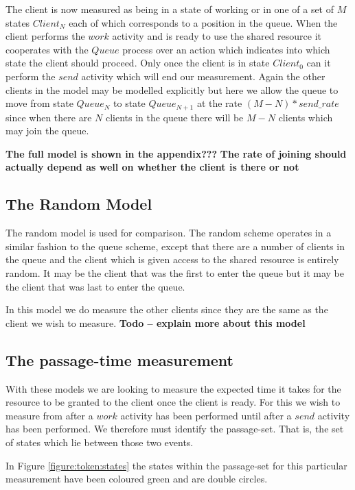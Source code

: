 \documentclass[times, 10pt,twocolumn]{article}
\newcommand{\adcComment}[1]{\textbf{#1}}
\newcommand{\quoteActivity}[1]{$#1$}
\newcommand{\quoteProcess}[1]{$#1$}
\begin{document}
The client is now measured as being in a state of working or
in one of a set of $M$ states \quoteProcess{Client_N} 
each of which corresponds to a position in the queue.
When the client performs the \quoteActivity{work} activity
and is ready to use the shared resource it cooperates with the
\quoteProcess{Queue} process over an action which indicates into which
state the client should proceed. Only once the client is in state
\quoteProcess{Client_0} can it perform the \quoteActivity{send}
activity which will end our measurement.
Again the other clients in the model may be modelled explicitly but
here we allow the queue to move from state \quoteProcess{Queue_N}
to state \quoteProcess{Queue_{N + 1}} at the rate
$(M - N) * send\_rate$ since when there are $N$ clients in the queue
there will be $M - N$ clients which may join the queue.

\adcComment{The full model is shown in the appendix???}
\adcComment{The rate of joining should actually depend as well on
whether the client is there or not}

\subsection{The Random Model}
The random model is used for comparison. The random scheme operates
in a similar fashion to the queue scheme, except that there are a number
of clients in the queue and the client which is given access to the shared
resource is entirely random. It may be the client that was the first to
enter the queue but it may be the client that was last to enter the queue.

In this model we do measure the other clients since they are the same
as the client we wish to measure.
\adcComment{Todo -- explain more about this model}

\subsection{The passage-time measurement}
With these models we are looking to measure the expected time it takes
for the resource to be granted to the client once the client is ready.
For this we wish to measure from after a \quoteActivity{work}
activity has been performed until after a \quoteActivity{send}
activity has been performed. We therefore must identify the
passage-set. That is, the set of states which lie between those two events.

In Figure \ref{figure:token:states} the states within the passage-set
for this particular measurement have been coloured green and are double circles.
\end{document}

